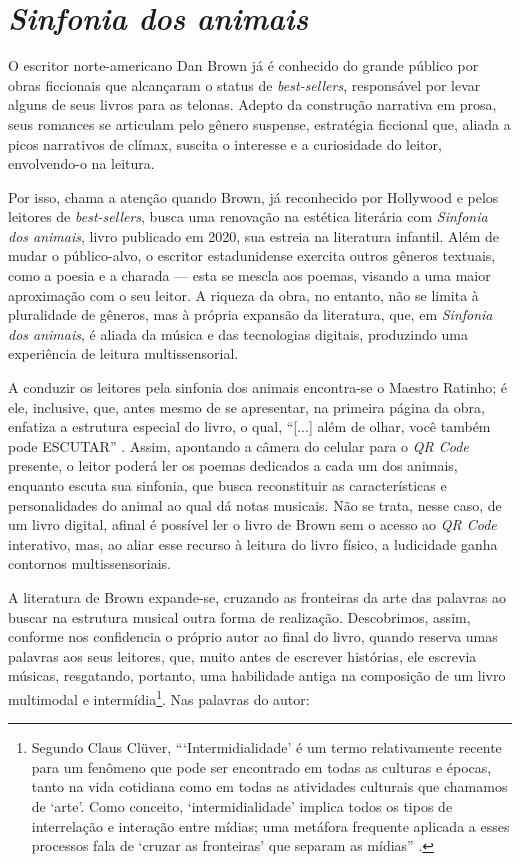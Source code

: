 \documentclass[portuguese]{textolivre}
\begin{document}
\section{\textit{Sinfonia dos animais}}\label{sec-fmt-manuscrito}

O escritor norte-americano Dan Brown já é conhecido do grande público por obras
ficcionais que alcançaram o status de \textit{best-sellers}, responsável por
levar alguns de seus livros para as telonas. Adepto da construção narrativa em
prosa, seus romances se articulam pelo gênero suspense, estratégia ficcional
que, aliada a picos narrativos de clímax, suscita o interesse e a curiosidade
do leitor, envolvendo-o na leitura.

Por isso, chama a atenção quando Brown, já reconhecido por Hollywood e pelos
leitores de \textit{best-sellers}, busca uma renovação na estética literária
com \textit{Sinfonia dos animais}, livro publicado em 2020, sua estreia na
literatura infantil. Além de mudar o público-alvo, o escritor estadunidense
exercita outros gêneros textuais, como a poesia e a charada — esta se mescla
aos poemas, visando a uma maior aproximação com o seu leitor. A riqueza da
obra, no entanto, não se limita à pluralidade de gêneros, mas à própria
expansão da literatura, que, em \textit{Sinfonia dos animais}, é aliada da
música e das tecnologias digitais, produzindo uma experiência de leitura
multissensorial.

A conduzir os leitores pela sinfonia dos animais encontra-se o Maestro Ratinho;
é ele, inclusive, que, antes mesmo de se apresentar, na primeira página da
obra, enfatiza a estrutura especial do livro, o qual, “[...] além de olhar,
você também pode ESCUTAR” \cite[s/p, destaque do autor]{brown_sinfonia_2020}.
Assim, apontando a câmera do celular para o \textit{QR Code} presente, o leitor
poderá ler os poemas dedicados a cada um dos animais, enquanto escuta sua
sinfonia, que busca reconstituir as características e personalidades do animal
ao qual dá notas musicais. Não se trata, nesse caso, de um livro digital,
afinal é possível ler o livro de Brown sem o acesso ao \textit{QR Code}
interativo, mas, ao aliar esse recurso à leitura do livro físico, a ludicidade
ganha contornos multissensoriais. 

A literatura de Brown expande-se, cruzando as fronteiras da arte das palavras
ao buscar na estrutura musical outra forma de realização. Descobrimos, assim,
conforme nos confidencia o próprio autor ao final do livro, quando reserva umas
palavras aos seus leitores, que, muito antes de escrever histórias, ele
escrevia músicas, resgatando, portanto, uma habilidade antiga na composição de
um livro multimodal e intermídia\footnote{Segundo Claus Clüver,
“‘Intermidialidade’ é um termo relativamente recente para um fenômeno que pode
ser encontrado em todas as culturas e épocas, tanto na vida cotidiana como em
todas as atividades culturais que chamamos de ‘arte’. Como conceito,
‘intermidialidade’ implica todos os tipos de interrelação e interação entre
mídias; uma metáfora frequente aplicada a esses processos fala de ‘cruzar as
fronteiras’ que separam as mídias” \cite[p.~9]{cluver_intermidialidade_2011}.}.
Nas palavras do autor:
\end{document}

